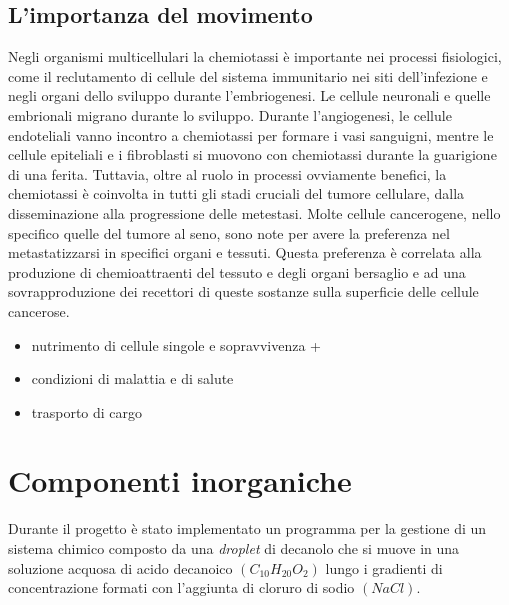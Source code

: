 \subsection{L'importanza del movimento}
\label{sec:00456}
Negli organismi multicellulari la chemiotassi è importante nei processi fisiologici, come il reclutamento di cellule del sistema immunitario nei siti dell'infezione e negli organi dello sviluppo durante l'embriogenesi.\cite{cellMig} Le cellule neuronali e quelle embrionali migrano durante lo sviluppo. Durante l'angiogenesi, le cellule endoteliali vanno incontro a chemiotassi per formare i vasi sanguigni, mentre le cellule epiteliali e i fibroblasti si muovono con chemiotassi durante la guarigione di una ferita.\cite{move1} Tuttavia, oltre al ruolo in processi ovviamente benefici, la chemiotassi è coinvolta in tutti gli stadi cruciali del tumore cellulare, dalla disseminazione alla progressione delle metestasi. Molte cellule cancerogene, nello specifico quelle del tumore al seno, sono note per avere la preferenza nel metastatizzarsi in specifici organi e tessuti. Questa preferenza è correlata alla produzione di chemioattraenti del tessuto e degli organi bersaglio e ad una sovrapproduzione dei recettori di queste sostanze sulla superficie delle cellule cancerose. 
\begin {itemize}
	\item nutrimento di cellule singole e sopravvivenza + 
	\item condizioni di malattia e di salute
	\item trasporto di cargo
\end{itemize}

\section{Componenti inorganiche}
\label{sec:123}
Durante il progetto è stato implementato un programma per la gestione di un sistema chimico composto da una \emph{droplet} di decanolo che si muove in una soluzione acquosa di acido decanoico $(C_{10}H_{20}O_{2})$ lungo i gradienti di concentrazione formati con l'aggiunta di cloruro di sodio $(NaCl)$. 




